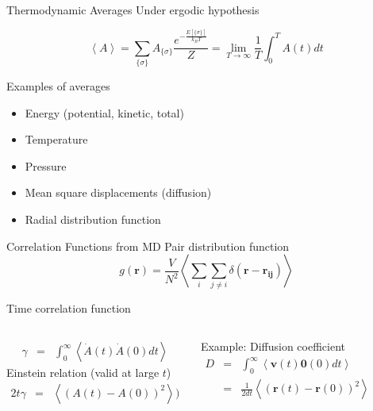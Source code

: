 \documentclass[aspectratio=169]{beamer}
\let \vec \mathbf
\begin{document}
    \begin{frame}{Thermodynamic Averages}
        Under ergodic hypothesis

        \begin{equation*}
            \left< A \right> = \sum_{\{\sigma\}} A_{\{\sigma\}} \frac{e^{-\frac{E[\{\sigma\}]}{k_BT}}}{Z} = \lim_{T\rightarrow \infty} \frac{1}{T} \int_0^T A(t) dt
        \end{equation*}

        Examples of averages
        \begin{itemize}
            \item Energy (potential, kinetic, total)
            \item Temperature
            \item Pressure
            \item Mean square displacements (diffusion)
            \item Radial distribution function
        \end{itemize}
    \end{frame}

    \begin{frame}{Correlation Functions from MD}
        Pair distribution function
        \begin{equation*}
            g(\vec{r}) = \frac{V}{N^2} \left< \sum_i \sum_{j \neq i} \delta(\vec{r} - \vec{r_{ij}}) \right>
        \end{equation*}

        Time correlation function

        \begin{columns}
            \begin{eqnarray*}
                \gamma & =  & \int_0^{\infty} \left< \dot{A}(t) \dot{A}(0) dt \right>
            \end{eqnarray*}
            Einstein relation (valid at large $t$)
            \begin{eqnarray*}
                2t \gamma & =  & \left< (A(t) - A(0))^2 \right> \mathrm{)}
            \end{eqnarray*}

            Example: Diffusion coefficient
            \begin{eqnarray*}
                D & =  & \int_0^{\infty} \left< \vec{v}(t) \vec{0}(0) dt \right> \\
                & =  & \frac{1}{2dt} \left< (\vec{r}(t) - \vec{r}(0))^2 \right>
            \end{eqnarray*}

        \end{columns}

    \end{frame}
\end{document}
